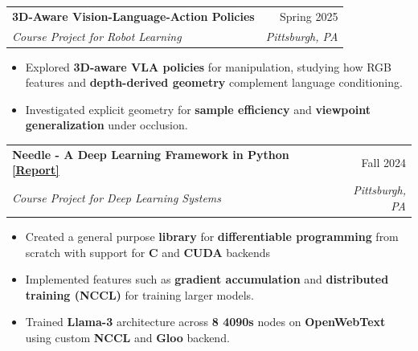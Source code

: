 \documentclass[letterpaper,10pt]{article}
\makeatletter
\newcommand{\resumeSubheading}[4]{
  \vspace{-1pt}\item[]
  \begin{tabular*}{0.98\textwidth}{l@{\extracolsep{\fill}}r}
      \hspace{-10pt}\textbf{#1} & #2 \\
      \hspace{-10pt}\textit{\small#3} & \textit{\small #4} \\
    \end{tabular*}\vspace{-5pt}
}
\makeatother
\begin{document}
    
    

   \resumeSubheading
   {3D-Aware Vision-Language-Action Policies}{Spring 2025}{Course Project for Robot Learning}{Pittsburgh, PA}
\begin{itemize}[leftmargin=*]
    \item Explored \textbf{3D-aware VLA policies} for manipulation, studying how RGB features and \textbf{depth-derived geometry} complement language conditioning.
    \item Investigated explicit geometry for \textbf{sample efficiency} and \textbf{viewpoint generalization} under occlusion.
\end{itemize}

 \resumeSubheading
   {Needle - A Deep Learning Framework in Python \href{https://colab.research.google.com/drive/13xndhmKBW1cjgtueA5-biCThGCdB6waA?usp=sharing}{[Report]}}{Fall 2024}{Course Project for Deep Learning Systems }{Pittsburgh, PA}
\begin{itemize}[leftmargin=*]
    \item  Created a general purpose \textbf{library} for \textbf{differentiable programming} from scratch with support for \textbf{C} and \textbf{CUDA} backends 
    \item Implemented features such as \textbf{gradient accumulation} and \textbf{distributed training (NCCL)} for training larger models.
        \item Trained \textbf{Llama-3} architecture across \textbf{8 4090s} nodes on \textbf{OpenWebText} using custom \textbf{NCCL} and \textbf{Gloo} backend.

\end{itemize}
\end{document}
